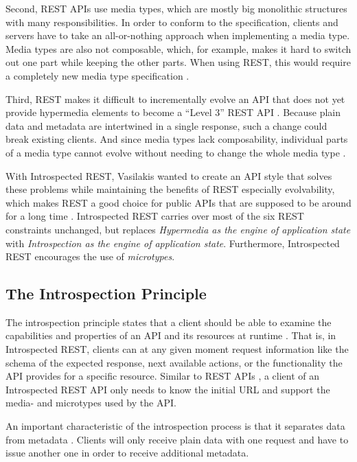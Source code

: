 Second, REST APIs use media types, which are mostly big monolithic structures with many responsibilities. In order to conform to the specification, clients and servers have to take an all-or-nothing approach when implementing a media type. Media types are also not composable, which, for example, makes it hard to switch out one part while keeping the other parts. When using REST, this would require a completely new media type specification \autocite[sec.~8.2.7.2]{Vasilakis2017}.

Third, REST makes it difficult to incrementally evolve an API that does not yet provide hypermedia elements to become a \enquote{Level 3} REST API \autocite{Richardson2008}. Because plain data and metadata are intertwined in a single response, such a change could break existing clients. And since media types lack composability, individual parts of a media type cannot evolve without needing to change the whole media type \autocites[secs.~8.2.5, 8.2.6.1]{Vasilakis2017}{Vasilakis2017a}.

With Introspected REST, Vasilakis wanted to create an API style that solves these problems while maintaining the benefits of REST \autocite[ch.~2]{Vasilakis2017} \textendash{} especially evolvability, which makes REST a good choice for public APIs that are supposed to be around for a long time \autocite[p.~41]{Block2014}. Introspected REST carries over most of the six REST constraints unchanged, but replaces \textit{Hypermedia as the engine of application state} with \textit{Introspection as the engine of application state}. Furthermore, Introspected REST encourages the use of \textit{microtypes}.

\subsection{The Introspection Principle}
The introspection principle states that a client should be able to examine the capabilities and properties of an API and its resources at runtime \autocite[sec.~9.3]{Vasilakis2017}. That is, in Introspected REST, clients can at any given moment request information like the schema of the expected response, next available actions, or the functionality the API provides for a specific resource. Similar to REST APIs \autocite{Fielding2008}, a client of an Introspected REST API only needs to know the initial URL and support the media- and microtypes used by the API.

An important characteristic of the introspection process is that it separates data from metadata \autocite[sec.~9.3.2]{Vasilakis2017}. Clients will only receive plain data with one request and have to issue another one in order to receive additional metadata.

